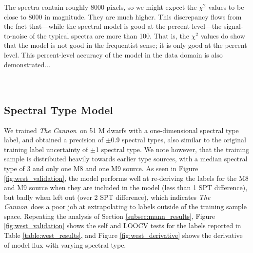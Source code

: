 \documentclass[modern]{aastex62}
\newcommand{\thecannon}{\textsl{The Cannon}}
\begin{document}
The spectra contain roughly 8000 pixels,
so we might expect the $\chi^2$ values to be close to 8000 in magnitude.
They are much higher.
This discrepancy flows from the fact that---while the spectral model is good at the percent
level---the signal-to-noise of the typical spectra are more than 100.
That is, the $\chi^2$ values do show that the model is not good in the frequentist
sense; it is only good at the percent level.
This percent-level accuracy of the model in the data domain is also demonstrated... \\

\color{gcolor}{BIRKY: Can you demonstrate this by showing the RMS residuals, putting it in as a figure, and putting this paragraph back to me? I am imagining a figure that shows a scatter plot of T vs RMS residual, colored by metallicity. Or something like that.}\color{black} \\

\color{gcolor}{HOGG: Adam's comment: if $\chi^2/n>>1$ then the model is NOT an accurate representation of the data.}\color{black} \\

\subsection{Spectral Type Model \label{subsec:west_results}}
We trained \thecannon\ on 51 M dwarfs with a one-dimensional spectral type label, and obtained a precision of $\pm$0.9 spectral types, also similar to the original training label uncertainty of $\pm$1 spectral type. We note however, that the training sample is distributed heavily towards earlier type sources, with a median spectral type of 3 and only one M8 and one M9 source. As seen in Figure \ref{fig:west_validation}, the model performs well at re-deriving the labels for the M8 and M9 source when they are included in the model (less than 1 SPT difference), but badly when left out (over 2 SPT difference), which indicates \thecannon\ does a poor job at extrapolating to labels outside of the training sample space. Repeating the analysis of Section \ref{subsec:mann_results}, Figure \ref{fig:west_validation} shows the self and LOOCV tests for the labels reported in Table \ref{table:west_results}, and Figure \ref{fig:west_derivative} shows the derivative of model flux with varying spectral type.
\end{document}
